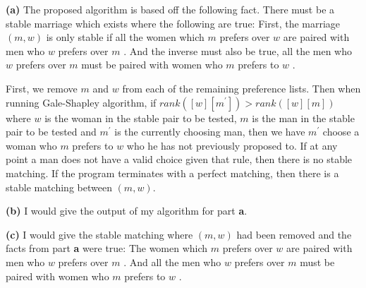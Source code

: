 \documentclass[12pt]{article}
\newenvironment{problem}[2][Problem]{\begin{trivlist}
\item[\hskip \labelsep {\bfseries #1}\hskip \labelsep {\bfseries #2.}]}{\end{trivlist}}
\newenvironment{subproblem}[1]{\textbf{(#1)}}{}
\theoremstyle{definition}
\begin{document}
\begin{problem}{3}

\begin{subproblem}{a}
The proposed algorithm is based off the following fact.
There must be a stable marriage which exists where the following are true:
First, the marriage $ (m, w) $ is only stable if all the women which $ m $ prefers over $ w $ are paired with men who $ w $ prefers over $ m $ .
And the inverse must also be true, all the men who $ w $ prefers over $ m $ must be paired with women who $ m $ prefers to $ w $ .

First, we remove $ m $ and $ w $ from each of the remaining preference lists.
Then when running Gale-Shapley algorithm, if $ rank([w][m^{'}]) > rank([w][m])$ where $ w $ is the woman in the stable pair to be tested, $ m $ is the man in the stable pair to be tested and $ m^{'} $ is the currently choosing man,
then we have $ m^{'} $ choose a woman who $ m $ prefers to $ w $ who he has not previously proposed to.
If at any point a man does not have a valid choice given that rule, then there is no stable matching.
If the program terminates with a perfect matching, then there is a stable matching between $ (m, w) $.
\end{subproblem}

\begin{subproblem}{b}
I would give the output of my algorithm for part \textbf{a}.
\end{subproblem}

\begin{subproblem}{c}
I would give the stable matching where $ (m, w) $ had been removed and the facts from part \textbf{a} were true:
The women which $ m $ prefers over $ w $ are paired with men who $ w $ prefers over $ m $ .
And all the men who $ w $ prefers over $ m $ must be paired with women who $ m $ prefers to $ w $ .
\end{subproblem}

\end{problem}
\end{document}
